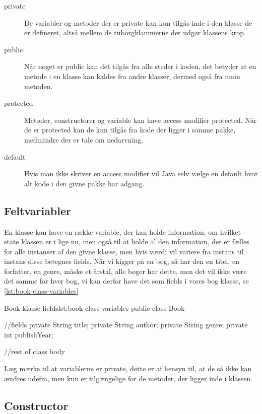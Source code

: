 \begin{description}
\item [private]     De variabler og metoder der er private kan kun tilgås inde
                    i den klasse de er defineret, altså mellem de tuborgklammerne
                    der udgør klassens krop.
\item [public]      Når noget er public kan det tilgås fra alle steder i koden,
                    det betyder at en metode i en klasse kan kaldes fra andre
                    klasser, dermed også fra main metoden.
\item [protected]   Metoder, constructorer og variable kan have access modifier
                    protected. Når de er protected kan de kun tilgås fra kode
                    der ligger i samme pakke, medmindre der er tale om
                    nedarvning.
\item [default]     Hvis man ikke skriver en access modifier vil Java selv vælge
                    en default hvor alt kode i den givne pakke har adgang.
\end{description}

\subsection{Feltvariabler}

En klasse kan have en række variable, der kan holde information, om
hvilket state klassen er i lige nu, men også til at holde al den
information, der er fælles for alle instanser af den givne klasse, men
hvis værdi vil variere fra instans til instans disse betegnes fields.
Når vi kigger på en bog, så har den en titel, en forfatter, en genre,
måske et årstal, alle bøger har dette, men det vil ikke være det samme
for hver bog, vi kan derfor have det som fields i vores bog klasse, se
\autoref{lst:book-class-variables}

\begin{JavaCode}{Book klasse fields}{lst:book-class-variables}
	public class Book {
		//fields
		private String title;
		private String author;
		private String genre;
		private int publishYear;

		//rest of class body
	}
\end{JavaCode}

Læg mærke til at variablerne er private, dette er af hensyn til, at de
så ikke kan ændres udefra, men kun er tilgængelige for de metoder, der
ligger inde i klassen.

\subsection{Constructor}

